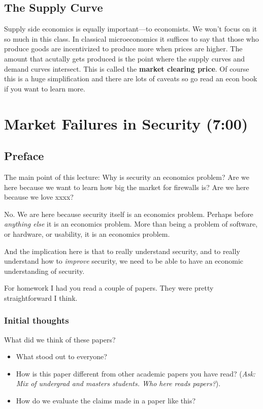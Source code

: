 \documentclass[11pt]{article}
\begin{document}
\subsection{The Supply Curve}

Supply side economics is equally important---to economists. We won't focus on it so much in this class. In classical microeconomics it suffices to say that those who produce goods are incentivized to produce more when prices are higher. The amount that acutally gets produced is the point where the supply curves and demand curves intersect. This is called the {\bf market clearing price}. Of course this is a huge simplification and there are lots of caveats so go read an econ book if you want to learn more. 

\section{Market Failures in Security (7:00)}


\subsection{Preface}

The main point of this lecture: Why is security an economics problem? Are we here because we want to learn how big the market for firewalls is? Are we here because we love xxxx?

No. We are here because security itself is an economics problem. Perhaps before \textit{anything else} it is an economics problem. More than being a problem of software, or hardware, or usability, it is an economics problem.

And the implication here is that to really understand security, and to really understand how to \textit{improve} security, we need to be able to have an economic understanding of security. 

For homework I had you read a couple of papers. They were pretty straightforward I think.

\subsubsection{Initial thoughts}

What did we think of these papers?

\begin{itemize}
    \item What stood out to everyone?
    \item How is this paper different from other academic papers you have read? ({\it Ask: Mix of undergrad and masters students. Who here reads papers?}). 
    \item How do we evaluate the claims made in a paper like this?
\end{itemize}
\end{document}
